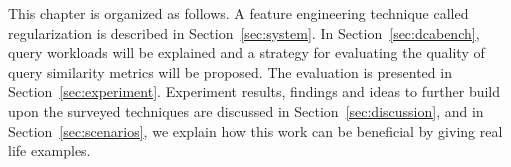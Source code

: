 This chapter is organized as follows.
A feature engineering technique called regularization is described in Section~\ref{sec:system}.
In Section~\ref{sec:dcabench}, query workloads will be explained and a strategy for evaluating the quality of query similarity metrics will be proposed.
The evaluation is presented in Section~\ref{sec:experiment}.
Experiment results, findings and ideas to further build upon the surveyed techniques are discussed in Section~\ref{sec:discussion}, and in Section~\ref{sec:scenarios}, we explain how this work can be beneficial by giving real life examples.
